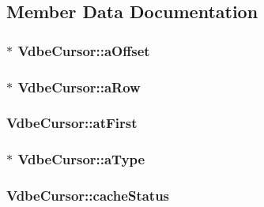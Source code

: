 \subsection{Member Data Documentation}
\hypertarget{struct_vdbe_cursor_a17431e67b341282aeb6c026cd01ec1e9}{
\subsubsection[{a\-Offset}]{$\ast$ Vdbe\-Cursor\-::a\-Offset}}\label{struct_vdbe_cursor_a17431e67b341282aeb6c026cd01ec1e9}
\hypertarget{struct_vdbe_cursor_a6bd10979ffb5d4828967eea1d6e0d2c8}{
\subsubsection[{a\-Row}]{$\ast$ Vdbe\-Cursor\-::a\-Row}}\label{struct_vdbe_cursor_a6bd10979ffb5d4828967eea1d6e0d2c8}
\hypertarget{struct_vdbe_cursor_a00d121ca0f21e7381aacb89adf40e8b6}{
\subsubsection[{at\-First}]{ Vdbe\-Cursor\-::at\-First}}\label{struct_vdbe_cursor_a00d121ca0f21e7381aacb89adf40e8b6}
\hypertarget{struct_vdbe_cursor_a6992d2bf9eb8480985aec47dae58f1ab}{
\subsubsection[{a\-Type}]{$\ast$ Vdbe\-Cursor\-::a\-Type}}\label{struct_vdbe_cursor_a6992d2bf9eb8480985aec47dae58f1ab}
\hypertarget{struct_vdbe_cursor_acf243b5a94a6e5a11341d6fece473c00}{
\subsubsection[{cache\-Status}]{ Vdbe\-Cursor\-::cache\-Status}}\label{struct_vdbe_cursor_acf243b5a94a6e5a11341d6fece473c00}
